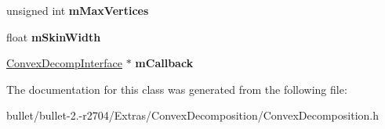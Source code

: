 \begin{DoxyCompactItemize}
\item 
\hypertarget{class_convex_decomposition_1_1_decomp_desc_aebaa387f6e17beac565adf831b535dc0}{unsigned int {\bfseries m\+Max\+Vertices}}\label{class_convex_decomposition_1_1_decomp_desc_aebaa387f6e17beac565adf831b535dc0}

\item 
\hypertarget{class_convex_decomposition_1_1_decomp_desc_a60d16f6a176268ca4ddf940fd247015b}{float {\bfseries m\+Skin\+Width}}\label{class_convex_decomposition_1_1_decomp_desc_a60d16f6a176268ca4ddf940fd247015b}

\item 
\hypertarget{class_convex_decomposition_1_1_decomp_desc_aed8ce4212508ed98f8002e53372ccc84}{\hyperlink{class_convex_decomposition_1_1_convex_decomp_interface}{Convex\+Decomp\+Interface} $\ast$ {\bfseries m\+Callback}}\label{class_convex_decomposition_1_1_decomp_desc_aed8ce4212508ed98f8002e53372ccc84}

\end{DoxyCompactItemize}


The documentation for this class was generated from the following file\+:\begin{DoxyCompactItemize}
\item 
bullet/bullet-\/2.-\/r2704/\+Extras/\+Convex\+Decomposition/Convex\+Decomposition.\+h\end{DoxyCompactItemize}
